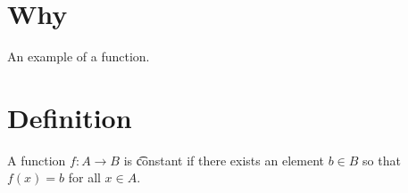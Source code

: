 
\section*{Why}

An example of a function.

\section*{Definition}

A function $f: A \to B$ is \t{constant} if there exists an element $b \in B$ so that $f(x) = b$ for all $x \in A$.

\blankpage